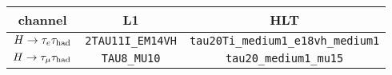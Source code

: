 \begin{tabular}{c|c|c}
  channel      & L1                       & HLT \\
  \hline
  $H\rightarrow\tau_e \tau_\text{had}$ & \texttt{2TAU11I\_EM14VH} & \texttt{tau20Ti\_medium1\_e18vh\_medium1} \\
  $H\rightarrow\tau_\mu \tau_\text{had}$ & \texttt{TAU8\_MU10}      & \texttt{tau20\_medium1\_mu15}             \\
\end{tabular}
